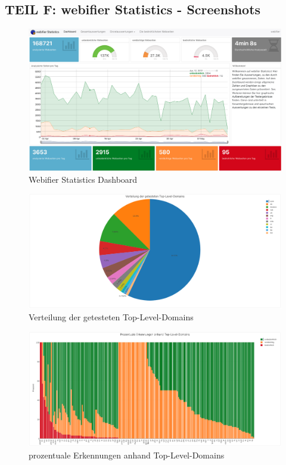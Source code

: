 \begin{landscape}

\section*{TEIL F: webifier Statistics - Screenshots}
\label{app:f}

\begin{figure}[H]
  \centering
  \includegraphics[width=\textheight]{images/stats/dashboard}
  \caption{Webifier Statistics Dashboard}
  \label{fig:dashboard}
\end{figure}

\begin{figure}[H]
  \centering
  \includegraphics[width=\textheight]{images/stats/tldverteilung}
  \caption{Verteilung der getesteten Top-Level-Domains}
  \label{fig:tldverteilung}
\end{figure}


\begin{figure}[H]
  \centering
  \includegraphics[width=\textheight]{images/stats/tldprozentual}
  \caption{prozentuale Erkennungen anhand Top-Level-Domains}
  \label{fig:tldprozentual}
\end{figure}



\end{landscape}
